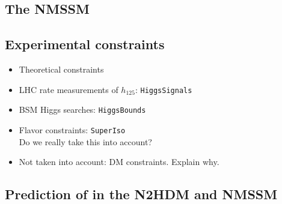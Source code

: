 \documentclass[12pt]{article}
\begin{document}
\subsection{The NMSSM}
\label{sec:nmssm}



\subsection{Experimental constraints}
\label{sec:constraints}

\begin{itemize}

\item
Theoretical constraints

\item
LHC rate measurements of $h_{125}$: \texttt{HiggsSignals}

\item
BSM Higgs searches: \texttt{HiggsBounds}

\item
Flavor constraints: \texttt{SuperIso}\\
Do we really take this into account?


\item
Not taken into account: DM constraints. Explain why.

\end{itemize}



\subsection{Prediction of  in the N2HDM and NMSSM}
\end{document}
